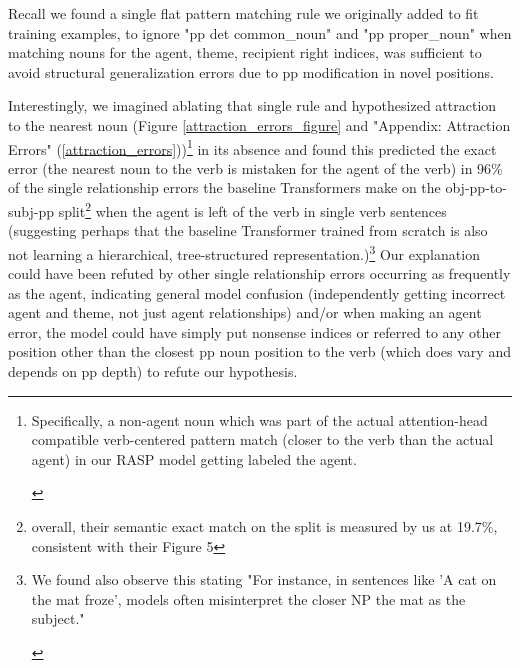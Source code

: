 \documentclass[11pt]{article}
\begin{document}
Recall we found a single flat pattern matching rule we originally added to fit training examples, to ignore "pp det common\_noun" and "pp proper\_noun" when matching nouns for the agent, theme, recipient right indices, was sufficient to avoid structural generalization errors due to pp modification in novel positions. 

Interestingly, we imagined ablating that single rule and hypothesized attraction to the nearest noun (Figure \ref{attraction_errors_figure} and "Appendix: Attraction Errors" (\ref{attraction_errors}))\footnote{\begin{footnotesize}Specifically, a non-agent noun which was part of the actual attention-head compatible verb-centered pattern match (closer to the verb than the actual agent) in our RASP model getting labeled the agent.
\end{footnotesize}
} in its absence and found this predicted the exact error 
(the nearest noun to the verb is mistaken for the agent of the verb) 
in 96\% of the single relationship errors the \cite{Wu2023} baseline Transformers make on the obj-pp-to-subj-pp split\footnote{overall, their semantic exact match on the split is measured by us at 19.7\%, consistent with their Figure 5} when the agent is left of the verb in single verb sentences
(suggesting perhaps that the baseline \cite{Wu2023} Transformer trained from scratch is also not learning a hierarchical, tree-structured representation.)\footnote{\begin{footnotesize}We found \cite{li2023slogstructuralgeneralizationbenchmark} also observe this stating "For instance, in sentences like 'A cat on the mat froze', models often misinterpret the closer NP the mat as the subject."\end{footnotesize}}
Our explanation could have been refuted by other single relationship errors occurring as frequently as the agent, indicating general model confusion (independently getting incorrect agent and theme, not just agent relationships) and/or when making an agent error, the model could have simply put nonsense indices or referred to any other position other than the closest pp noun position to the verb (which does vary and depends on pp depth) to refute our hypothesis.
\end{document}
